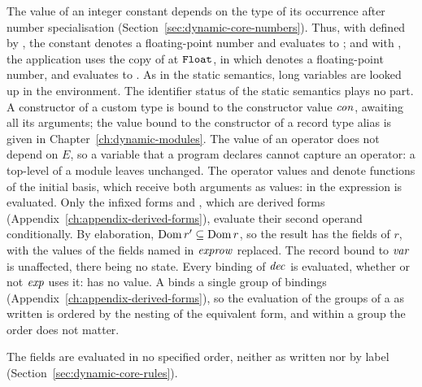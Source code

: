 \begin{rulecomments}
 The value of an integer constant depends on the
type of its occurrence after number specialisation
(Section~\ref{sec:dynamic-core-numbers}). Thus, with  defined
by , the constant denotes a floating-point number and
 evaluates to ; and with
, the application  uses the copy of  at
$\mathtt{Float}$, in which  denotes a floating-point number, and evaluates to
. %
 As in the static semantics, long variables are
looked up in the environment. The identifier status of the static semantics
plays no part.
 A constructor of a custom type is bound to the
constructor value $\mathit{con}$, awaiting all its arguments; the value bound to the
constructor of a record type alias is given in
Chapter~\ref{ch:dynamic-modules}.
 The value of an operator does not depend on $E$, so
a variable that a program declares cannot capture an operator: a top-level
 of a module leaves \kw{(+)} unchanged. The operator values
\kw{(\&\&)} and \kw{(||)} denote
functions of the initial basis, which receive both arguments as values: in
 the expression  is evaluated. Only the infixed forms
 and , which are derived forms
(Appendix~\ref{ch:appendix-derived-forms}), evaluate their second operand
conditionally. %
 By elaboration, $\mathrm{Dom}\, r'\subseteq\mathrm{Dom}\, r$, so the
result has the fields of $r$, with the values of the fields named in
$\mathit{exprow}$ replaced. The record bound to $\mathit{var}$ is unaffected, there being no
state.
 Every binding of $\mathit{dec}$ is evaluated, whether or not
$\mathit{exp}$ uses it:  has no value. A 
binds a single group of bindings (Appendix~\ref{ch:appendix-derived-forms}),
so the evaluation of the groups of a  as written is ordered by the
nesting of the equivalent form, and within a group the order does not
matter. %
\end{rulecomments}


  {}

\begin{rulecomments}
 The fields are evaluated in no specified order,
neither as written nor by label (Section~\ref{sec:dynamic-core-rules}). %
\end{rulecomments}

